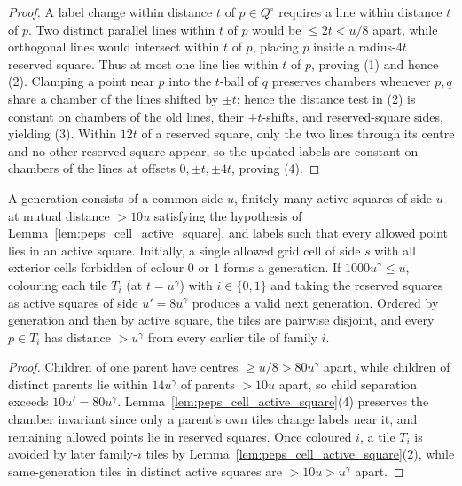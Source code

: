 \begin{proof}\leanok
    A label change within distance $t$ of $p\in Q^\circ$ requires a line within distance $t$ of $p$.
    Two distinct parallel lines within $t$ of $p$ would be $\le 2t<u/8$ apart, while orthogonal lines
    would intersect within $t$ of $p$, placing $p$ inside a radius-$4t$ reserved square. Thus at most one
    line lies within $t$ of $p$, proving (1) and hence (2). Clamping a point near $p$ into the
    $t$-ball of $q$ preserves chambers whenever $p,q$ share a chamber of the lines shifted by $\pm t$;
    hence the distance test in (2) is constant on chambers of the old lines, their $\pm t$-shifts,
    and reserved-square sides, yielding (3). Within $12t$ of a reserved square, only the two lines
    through its centre and no other reserved square appear, so the updated labels are constant on
    chambers of the lines at offsets $0,\pm t,\pm4t$, proving (4).
\end{proof}

\begin{lemma}
    \label{lem:peps_cell_generation_invariant}
    \leanok
    A generation consists of a common side $u$, finitely many active squares of
    side $u$ at mutual distance $>10u$ satisfying the hypothesis of
    Lemma~\ref{lem:peps_cell_active_square}, and labels such that every allowed point
    lies in an active square. Initially, a single allowed grid cell of side $s$ with
    all exterior cells forbidden of colour $0$ or $1$ forms a generation.
    If $1000u^{\gamma}\le u$, colouring each tile $T_i$ (at $t=u^{\gamma}$) with $i\in\{0,1\}$
    and taking the reserved squares as active squares of side $u'=8u^{\gamma}$ produces
    a valid next generation. Ordered by generation and then by active square, the tiles
    are pairwise disjoint, and every $p\in T_i$ has distance $>u^{\gamma}$ from every
    earlier tile of family $i$.
\end{lemma}
\begin{proof}\leanok
    Children of one parent have centres $\ge u/8>80u^{\gamma}$ apart, while children of distinct
    parents lie within $14u^{\gamma}$ of parents $>10u$ apart, so child separation exceeds $10u'=80u^{\gamma}$.
    Lemma~\ref{lem:peps_cell_active_square}(4) preserves the chamber invariant since only a parent's own tiles
    change labels near it, and remaining allowed points lie in reserved squares. Once coloured $i$,
    a tile $T_i$ is avoided by later family-$i$ tiles by Lemma~\ref{lem:peps_cell_active_square}(2),
    while same-generation tiles in distinct active squares are $>10u>u^{\gamma}$ apart.
\end{proof}

